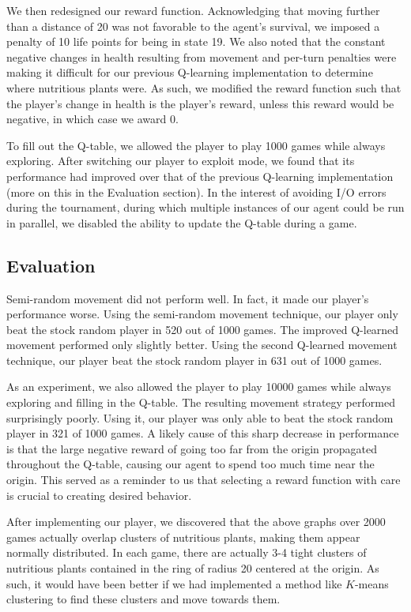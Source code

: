\documentclass[solution, letterpaper]{cs121}
\begin{document}
We then redesigned our reward function. Acknowledging that moving further than a distance of 20 was not favorable to the agent's survival, we imposed a penalty of 10 life points for being in state 19. We also noted that the constant negative changes in health resulting from movement and per-turn penalties were making it difficult for our previous Q-learning implementation to determine where nutritious plants were. As such, we modified the reward function such that the player's change in health is the player's reward, unless this reward would be negative, in which case we award 0.

To fill out the Q-table, we allowed the player to play 1000 games while always exploring. After switching our player to exploit mode, we found that its performance had improved over that of the previous Q-learning implementation (more on this in the Evaluation section). In the interest of avoiding I/O errors during the tournament, during which multiple instances of our agent could be run in parallel, we disabled the ability to update the Q-table during a game.

\subsection{Evaluation}
\hspace{4mm} Semi-random movement did not perform well. In fact, it made our player's performance worse. Using the semi-random movement technique, our player only beat the stock random player in 520 out of 1000 games. The improved Q-learned movement performed only slightly better. Using the second Q-learned movement technique, our player beat the stock random player in 631 out of 1000 games.

As an experiment, we also allowed the player to play 10000 games while always exploring and filling in the Q-table. The resulting movement strategy performed surprisingly poorly. Using it, our player was only able to beat the stock random player in 321 of 1000 games. A likely cause of this sharp decrease in performance is that the large negative reward of going too far from the origin propagated throughout the Q-table, causing our agent to spend too much time near the origin. This served as a reminder to us that selecting a reward function with care is crucial to creating desired behavior.

After implementing our player, we discovered that the above graphs over 2000 games actually overlap clusters of nutritious plants, making them appear normally distributed. In each game, there are actually 3-4 tight clusters of nutritious plants contained in the ring of radius 20 centered at the origin. As such, it would have been better if we had implemented a method like $K$-means clustering to find these clusters and move towards them.
\end{document}
